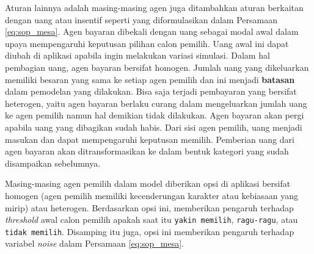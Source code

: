 Aturan lainnya adalah masing-masing agen juga ditambahkan aturan berkaitan dengan uang atau insentif seperti yang diformulasikan dalam Persamaan \ref{eq:sop_mesa}. Agen bayaran dibekali dengan uang sebagai modal awal dalam upaya mempengaruhi keputusan pilihan calon pemilih. Uang awal ini dapat diubah di aplikasi apabila ingin melakukan variasi simulasi. Dalam hal pembagian uang, agen bayaran bersifat homogen. Jumlah uang yang dikeluarkan memiliki besaran yang sama ke setiap agen pemilih dan ini menjadi \textbf{batasan} dalam pemodelan yang dilakukan. Bisa saja terjadi pembayaran yang bersifat heterogen, yaitu agen bayaran berlaku curang dalam mengeluarkan jumlah uang ke agen pemilih namun hal demikian tidak dilakukan. Agen bayaran akan pergi apabila uang yang dibagikan sudah habis. Dari sisi agen pemilih, uang menjadi masukan dan dapat mempengaruhi keputusan memilih. Pemberian uang dari agen bayaran akan ditransformasikan ke dalam bentuk kategori yang sudah disampaikan sebelumnya.

Masing-masing agen pemilih dalam model diberikan opsi di aplikasi bersifat homogen (agen pemilih memiliki kecenderungan karakter atau kebiasaan yang mirip) atau heterogen. Berdasarkan opsi ini, memberikan pengaruh terhadap \textit{threshold} awal calon pemilih apakah saat itu \texttt{yakin memilih}, \texttt{ragu-ragu}, atau \texttt{tidak memilih}. Disamping itu juga, opsi ini memberikan pengaruh terhadap variabel \textit{noise} dalam Persamaan \ref{eq:sop_mesa}.
